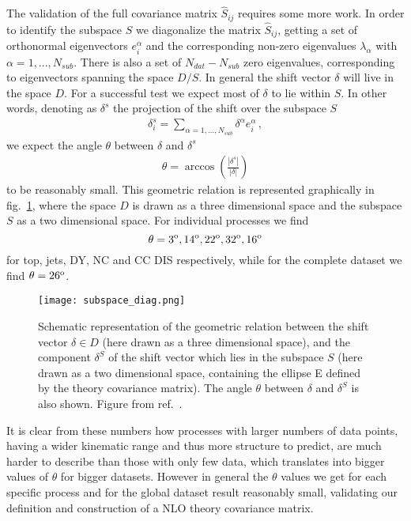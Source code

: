     The validation of the full covariance matrix $\hat{S}_{ij}$ requires some more work.
    In order to identify the subspace $S$ we diagonalize the matrix $\hat{S}_{ij}$, getting a set
    of orthonormal eigenvectors $e_i^{\alpha}$ and the corresponding non-zero eigenvalues 
    $\lambda_{\alpha}$ with $\alpha = 1, ..., N_{sub}$.
    There is also a set of $N_{dat}-N_{sub}$ zero eigenvalues, corresponding to eigenvectors spanning
    the space $D/S$.
    In general the shift vector $\delta$ will live in the space $D$. 
    For a successful test we expect most of $\delta$ to lie within $S$.
    In other words, denoting as $\delta^s$ the projection of the shift over the subspace $S$
    \begin{align}
        \delta_i^s = \sum_{\alpha=1,...,N_{sub}} \delta^{\alpha}e^{\alpha}_i\,,
    \end{align} 
    we expect the angle $\theta$ between $\delta$ and $\delta^s$
    \begin{align}
        \label{eq:angle}
        \theta = \arccos\left(\frac{|\delta^s|}{|\delta|}\right)
    \end{align}
    to be reasonably small. This geometric relation is represented graphically in fig.~\ref{fig:subspace_diagram},
    where the space $D$ is drawn as a three dimensional space and the subspace $S$ as a two dimensional space.
    For individual processes we find 
    \[\theta = 3^{\rm o}, 14^{\rm o}, 22^{\rm o}, 32^{\rm o}, 16^{\rm o}\]
    for top, jets, DY, NC and CC DIS respectively, 
    while for the complete dataset we find $\theta = 26^{\rm o}$.
    \begin{figure}[t]
        \begin{center}
          \texttt{[image: subspace\_diag.png]}
          \caption{\small Schematic representation of the geometric relation
            between the shift vector $\delta\in D$ (here drawn as a three dimensional space), and
            the component $\delta^S$ of the shift vector which lies in the 
      subspace $S$ (here drawn as a two dimensional space, containing the ellipse E defined by the theory covariance matrix). 
      The angle $\theta$ between $\delta$ and $\delta^S$ is also shown. Figure from ref.~\cite{AbdulKhalek:2019ihb}.
          \label{fig:subspace_diagram} }
        \end{center}
      \end{figure}
    It is clear from these numbers how processes with larger numbers of data points, having 
    a wider kinematic range and thus more structure to predict, are much harder to describe than those 
    with only few data, which translates into bigger values of $\theta$ for bigger datasets. However in general the
    $\theta$ values we get for each specific process and for the global dataset result reasonably small, validating our definition
    and construction of a NLO theory covariance matrix.

